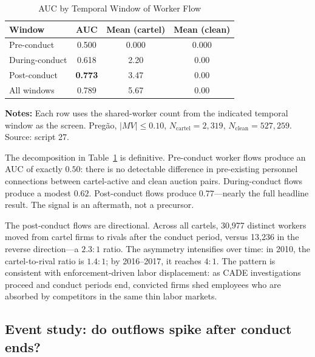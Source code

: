 \begin{table}[htbp]
\centering
\caption{AUC by Temporal Window of Worker Flow}\label{tab:temporal_decomp}
\begin{tabular}{lccc}
\toprule
Window & AUC & Mean (cartel) & Mean (clean) \\
\midrule
Pre-conduct & 0.500 & 0.000 & 0.000 \\
During-conduct & 0.618 & 2.20 & 0.00 \\
Post-conduct & \textbf{0.773} & 3.47 & 0.00 \\
All windows & 0.789 & 5.67 & 0.00 \\
\bottomrule
\end{tabular}
\vspace{0.5em}
\begin{minipage}{0.85\textwidth}
\scriptsize{\textbf{Notes:} Each row uses the shared-worker count from the indicated temporal window as the screen. Preg\~{a}o, $\lvert MV \rvert \le 0.10$, $N_{\text{cartel}} = 2{,}319$, $N_{\text{clean}} = 527{,}259$. Source: script 27.\par}
\end{minipage}
\end{table}

The decomposition in Table~\ref{tab:temporal_decomp} is definitive. Pre-conduct worker flows produce an AUC of exactly $0.50$: there is no detectable difference in pre-existing personnel connections between cartel-active and clean auction pairs. During-conduct flows produce a modest $0.62$. Post-conduct flows produce $0.77$---nearly the full headline result. The signal is an aftermath, not a precursor.

The post-conduct flows are directional. Across all cartels, 30{,}977 distinct workers moved from cartel firms to rivals after the conduct period, versus 13{,}236 in the reverse direction---a $2.3{:}1$ ratio. The asymmetry intensifies over time: in 2010, the cartel-to-rival ratio is $1.4{:}1$; by 2016--2017, it reaches $4{:}1$. The pattern is consistent with enforcement-driven labor displacement: as CADE investigations proceed and conduct periods end, convicted firms shed employees who are absorbed by competitors in the same thin labor markets.

\subsection{Event study: do outflows spike after conduct ends?}\label{sec:event_study}

